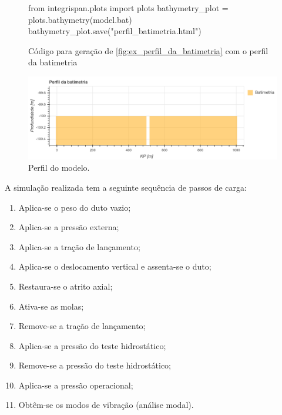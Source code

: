 \begin{figure}[!ht] %
\caption{Código para geração de \autoref{fig:ex_perfil_da_batimetria} com o perfil da batimetria}\label{code:perfil-da-batimetria}
\begin{pythoncode}
from integrispan.plots import plots
bathymetry_plot = plots.bathymetry(model.bat)
bathymetry_plot.save("perfil_batimetria.html")
\end{pythoncode}
\end{figure}

\begin{figure}[!ht]
    \centering
    \caption{Perfil do modelo.}\label{fig:ex_perfil_da_batimetria}
    \includegraphics[width=\textwidth]{imagens/exemplo/ex_perfil_da_batimetriat.png}
\end{figure}

A simulação realizada tem a seguinte sequência de passos de carga:

\begin{enumerate}
	\item Aplica-se o peso do duto vazio;
	\item Aplica-se a pressão externa;
	\item Aplica-se a tração de lançamento;
	\item Aplica-se o deslocamento vertical e assenta-se o duto;
	\item Restaura-se o atrito axial;
	\item Ativa-se as molas;
	\item Remove-se a tração de lançamento;
	\item Aplica-se a pressão do teste hidrostático;
	\item Remove-se a pressão do teste hidrostático;
	\item Aplica-se a pressão operacional;
	\item Obtêm-se os modos de vibração (análise modal).
\end{enumerate}


